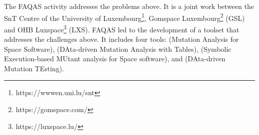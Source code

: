 
The FAQAS activity addresses the problems above. It is a joint work between the SnT Centre of the University of Luxembourg\footnote{https://wwwen.uni.lu/snt}, Gomspace Luxembourg\footnote{https://gomspace.com/} (GSL) and OHB Luxspace\footnote{https://luxspace.lu/} (LXS).
FAQAS led to the development of a toolset that addresses the challenges above. It includes four tools:
 (Mutation Analysis for Space Software), 
 (DAta-driven Mutation Analysis with Tables), 
 (Symbolic Execution-based MUtant analysis for Space software),
and  (DAta-driven Mutation TEsting).



